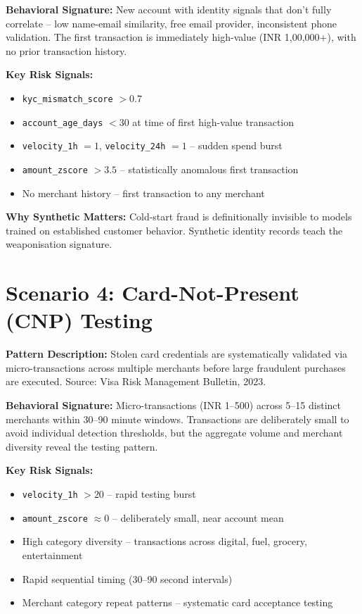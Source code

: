 \documentclass[12pt,a4paper,oneside]{book}
\begin{document}
\textbf{Behavioral Signature:} New account with identity signals that don't fully correlate -- low name-email similarity, free email provider, inconsistent phone validation. The first transaction is immediately high-value (INR 1,00,000+), with no prior transaction history.

\textbf{Key Risk Signals:}
\begin{itemize}
    \item \texttt{kyc\_mismatch\_score} $> 0.7$
    \item \texttt{account\_age\_days} $< 30$ at time of first high-value transaction
    \item \texttt{velocity\_1h} $= 1$, \texttt{velocity\_24h} $= 1$ -- sudden spend burst
    \item \texttt{amount\_zscore} $> 3.5$ -- statistically anomalous first transaction
    \item No merchant history -- first transaction to any merchant
\end{itemize}

\textbf{Why Synthetic Matters:} Cold-start fraud is definitionally invisible to models trained on established customer behavior. Synthetic identity records teach the weaponisation signature.

\section{Scenario 4: Card-Not-Present (CNP) Testing}

\textbf{Pattern Description:} Stolen card credentials are systematically validated via micro-transactions across multiple merchants before large fraudulent purchases are executed. Source: Visa Risk Management Bulletin, 2023.

\textbf{Behavioral Signature:} Micro-transactions (INR 1--500) across 5--15 distinct merchants within 30--90 minute windows. Transactions are deliberately small to avoid individual detection thresholds, but the aggregate volume and merchant diversity reveal the testing pattern.

\textbf{Key Risk Signals:}
\begin{itemize}
    \item \texttt{velocity\_1h} $> 20$ -- rapid testing burst
    \item \texttt{amount\_zscore} $\approx 0$ -- deliberately small, near account mean
    \item High category diversity -- transactions across digital, fuel, grocery, entertainment
    \item Rapid sequential timing (30--90 second intervals)
    \item Merchant category repeat patterns -- systematic card acceptance testing
\end{itemize}
\end{document}
